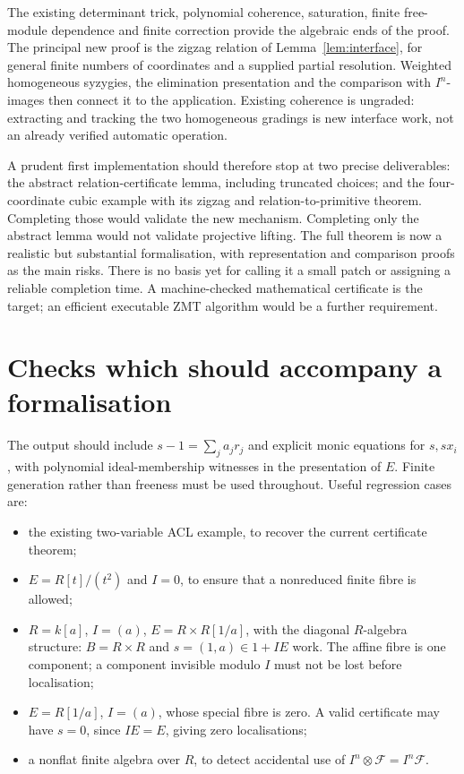 \documentclass[11pt]{amsart}
\theoremstyle{definition}
\theoremstyle{remark}
\newcommand{\FF}{\mathcal F}
\begin{document}
The existing determinant trick, polynomial coherence, saturation,
finite free-module dependence and finite correction provide the
algebraic ends of the proof. The principal new proof is the zigzag
relation of Lemma~\ref{lem:interface}, for general finite numbers of
coordinates and a supplied partial resolution. Weighted homogeneous
syzygies, the elimination presentation and the comparison with
$I^n$-images then connect it to the application. Existing coherence
is ungraded: extracting and tracking the two homogeneous gradings is
new interface work, not an already verified automatic operation.

A prudent first implementation should therefore stop at two precise
deliverables: the abstract relation-certificate lemma, including
truncated choices; and the four-coordinate cubic example with its
zigzag and relation-to-primitive theorem. Completing those would
validate the new mechanism. Completing only the abstract lemma would
not validate projective lifting. The full theorem is now a realistic
but substantial formalisation, with representation and comparison
proofs as the main risks. There is no basis yet for calling it a
small patch or assigning a reliable completion time. A machine-checked
mathematical certificate is the target; an efficient executable ZMT
algorithm would be a further requirement.

\section{Checks which should accompany a formalisation}

The output should include $s-1=\sum_j a_jr_j$ and explicit monic
equations for $s,sx_i$, with polynomial ideal-membership witnesses in
the presentation of $E$. Finite generation rather than freeness must
be used throughout. Useful regression cases are:
\begin{itemize}
\item the existing two-variable ACL example, to recover the current
certificate theorem;
\item $E=R[t]/(t^2)$ and $I=0$, to ensure that a nonreduced finite
fibre is allowed;
\item $R=k[a]$, $I=(a)$, $E=R\times R[1/a]$, with the diagonal
$R$-algebra structure: $B=R\times R$ and $s=(1,a)\in1+IE$ work.
The affine fibre is one component; a component invisible modulo $I$
must not be lost before localisation;
\item $E=R[1/a]$, $I=(a)$, whose special fibre is zero. A valid
certificate may have $s=0$, since $IE=E$, giving zero localisations;
\item a nonflat finite algebra over $R$, to detect accidental use of
$I^n\otimes\FF=I^n\FF$.
\end{itemize}
\end{document}
